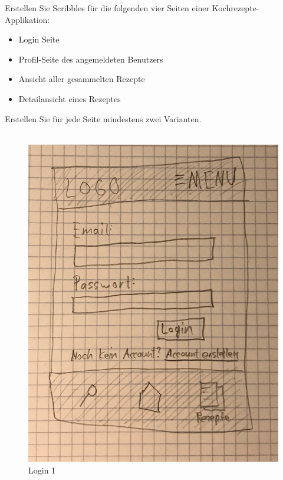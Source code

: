 \begin{exercise}
  Erstellen Sie Scribbles für die folgenden vier Seiten einer Kochrezepte-Applikation:
  \begin{itemize}
    \item Login Seite
    \item Profil-Seite des angemeldeten Benutzers
    \item Ansicht aller gesammelten Rezepte
    \item Detailansicht eines Rezeptes
  \end{itemize}
  Erstellen Sie für jede Seite mindestens zwei Varianten.
  \\\\
\end{exercise}

\begin{figure}[H]
  \includegraphics[width=\linewidth]{./exercise13/Login1.jpeg}
  \caption{Login 1}
\end{figure}

